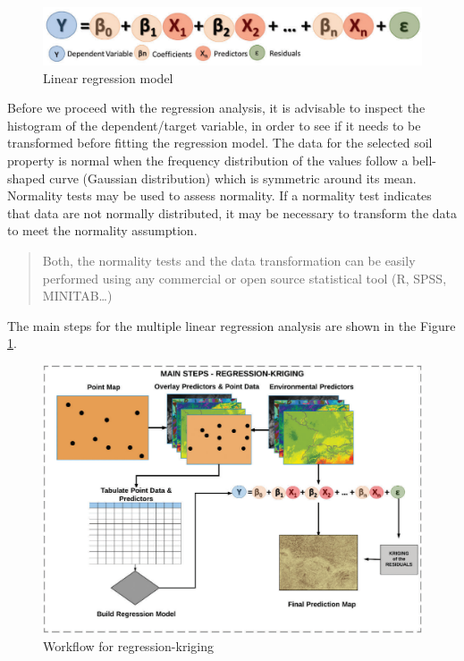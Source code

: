\documentclass[10pt,b5paper,]{book}
\theoremstyle{definition}
\theoremstyle{definition}
\theoremstyle{definition}
\theoremstyle{remark}
\begin{document}
\begin{figure}
\centering
\includegraphics{images/RKequation.png}
\caption{Linear regression model}
\end{figure}

Before we proceed with the regression analysis, it is advisable to
inspect the histogram of the dependent/target variable, in order to see
if it needs to be transformed before fitting the regression model. The
data for the selected soil property is normal when the frequency
distribution of the values follow a bell-shaped curve (Gaussian
distribution) which is symmetric around its mean. Normality tests may be
used to assess normality. If a normality test indicates that data are
not normally distributed, it may be necessary to transform the data to
meet the normality assumption.

\begin{quote}
Both, the normality tests and the data transformation can be easily
performed using any commercial or open source statistical tool (R, SPSS,
MINITAB\ldots{})
\end{quote}

The main steps for the multiple linear regression analysis are shown in
the Figure \ref{fig:workflowRK}.

\begin{figure}

{\centering \includegraphics[width=0.8\linewidth]{images/RKworkflow} 

}

\caption{Workflow for regression-kriging}\label{fig:workflowRK}
\end{figure}
\end{document}

